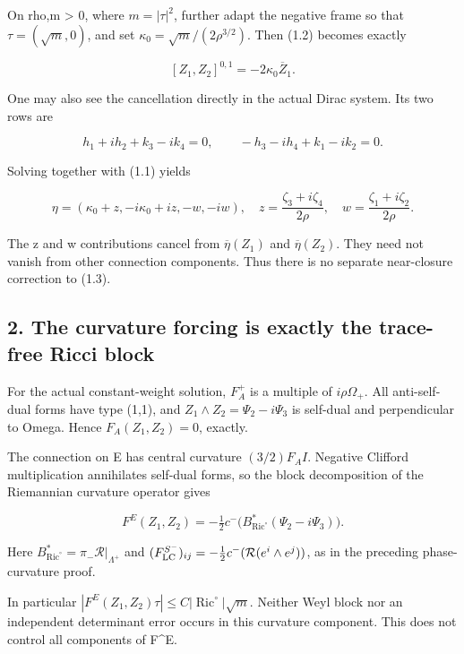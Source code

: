 \documentclass[
  10pt,
]{article}
\begin{document}
On rho,m \textgreater{} 0, where \(m=|\tau|^2\), further adapt the
negative frame so that \(\tau=(\sqrt m,0)\), and set
\(\kappa_0=\sqrt m/(2\rho^{3/2})\). Then (1.2) becomes exactly

\[
                [Z_1,Z_2]^{0,1}=-2\kappa_0\overline Z_1.   \tag{1.3}
\]

One may also see the cancellation directly in the actual Dirac system.
Its two rows are

\[
 h_1+ih_2+k_3-ik_4=0,\qquad
 -h_3-ih_4+k_1-ik_2=0.
\]

Solving together with (1.1) yields

\[
 \eta=(\kappa_0+z,-i\kappa_0+iz,-w,-iw),\quad
 z=\frac{\zeta_3+i\zeta_4}{2\rho},\quad
 w=\frac{\zeta_1+i\zeta_2}{2\rho}.
\]

The z and w contributions cancel from \(\overline\eta(Z_1)\) and
\(\overline\eta(Z_2)\). They need not vanish from other connection
components. Thus there is no separate near-closure correction to (1.3).

\hypertarget{the-curvature-forcing-is-exactly-the-trace-free-ricci-block}{%
\subsection{2. The curvature forcing is exactly the trace-free Ricci
block}\label{the-curvature-forcing-is-exactly-the-trace-free-ricci-block}}

For the actual constant-weight solution, \(F_A^+\) is a multiple of
\(i\rho\Omega_+\). All anti-self-dual forms have type (1,1), and
\(Z_1\wedge Z_2=\Psi_2-i\Psi_3\) is self-dual and perpendicular to
Omega. Hence \(F_A(Z_1,Z_2)=0\), exactly.

The connection on E has central curvature \((3/2)F_A I\). Negative
Clifford multiplication annihilates self-dual forms, so the block
decomposition of the Riemannian curvature operator gives

\[
 \boxed{F^E(Z_1,Z_2)
   =-\tfrac12c^-\bigl(B_{\operatorname{Ric}^{\circ}}^*
                          (\Psi_2-i\Psi_3)\bigr).}       \tag{2.1}
\]

Here \(B_{\operatorname{Ric}^{\circ}}^*=\pi_-\mathcal R|_{\Lambda^+}\)
and \((F_{\rm LC}^{S^-})_{ij}=-\tfrac12c^-(\mathcal R(e^i\wedge e^j))\),
as in the preceding phase-curvature proof.

In particular
\(|F^E(Z_1,Z_2)\tau|\le C|\operatorname{Ric}^{\circ}|\sqrt m\). Neither
Weyl block nor an independent determinant error occurs in this curvature
component. This does not control all components of F\^{}E.
\end{document}
